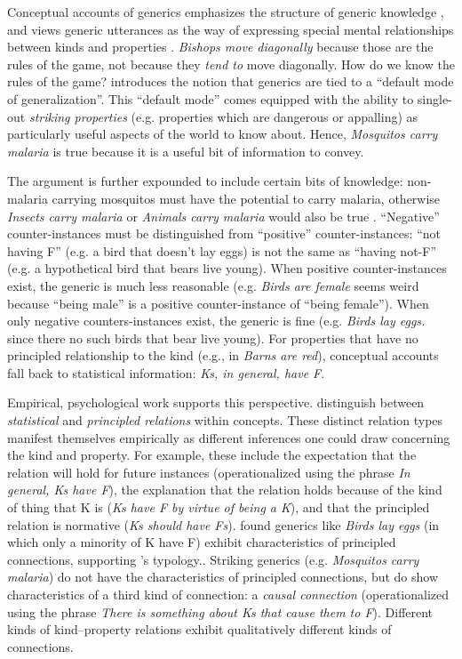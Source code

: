 \documentclass[12pt,letterpaper]{article}
\begin{document}
Conceptual accounts of generics emphasizes the structure of generic knowledge \cite{Prasada2000}, and views generic utterances as the way of expressing special mental relationships between kinds and properties \cite{Leslie2008, Prasada2012}.
\emph{Bishops move diagonally} because those are the rules of the game, not because they \emph{tend to} move diagonally.
How do we know the rules of the game?
 introduces the notion that generics are tied to a ``default mode of generalization''. 
This ``default mode'' comes equipped with the ability to single-out \emph{striking properties} (e.g. properties which are dangerous or appalling) as particularly useful aspects of the world to know about. 
Hence, \emph{Mosquitos carry malaria} is true because it is a useful bit of information to convey.

The argument is further expounded to include certain bits of knowledge: non-malaria carrying mosquitos must have the potential to carry malaria, otherwise \emph{Insects carry malaria} or \emph{Animals carry malaria} would also be true \cite{Leslie2007}.
``Negative'' counter-instances must be distinguished from ``positive'' counter-instances: ``not having F'' (e.g. a bird that doesn't lay eggs) is not the same as ``having not-F'' (e.g. a hypothetical bird that bears live young).
When positive counter-instances exist, the generic is much less reasonable (e.g. \emph{Birds are female} seems weird because ``being male'' is a positive counter-instance of ``being female''). 
When only negative counters-instances exist, the generic is fine (e.g. \emph{Birds lay eggs.} since there no such birds that bear live young).
For properties that have no principled relationship to the kind (e.g., in \emph{Barns are red}), conceptual accounts fall back to statistical information: \emph{Ks, in general, have F}.

Empirical, psychological work supports this perspective.
 distinguish between \emph{statistical} and \emph{principled relations} within concepts. 
These distinct relation types manifest themselves empirically as different inferences one could draw concerning the kind and property. 
For example, these include the expectation that the relation will hold for future instances (operationalized using the phrase \emph{In general, Ks have F}), the explanation that the relation holds because of the kind of thing that K is (\emph{Ks have F by virtue of being a K}), and that the principled relation is normative (\emph{Ks should have Fs}).
 found generics like \emph{Birds lay eggs} (in which only a minority of K have F) exhibit characteristics of principled connections, supporting 's typology.. 
Striking generics (e.g. \emph{Mosquitos carry malaria}) do not have the characteristics of principled connections, but do show characteristics of a third kind of connection: a \emph{causal connection} (operationalized using the phrase \emph{There is something about Ks that cause them to F}). 
Different kinds of kind--property relations exhibit qualitatively different kinds of connections. 
\end{document}
